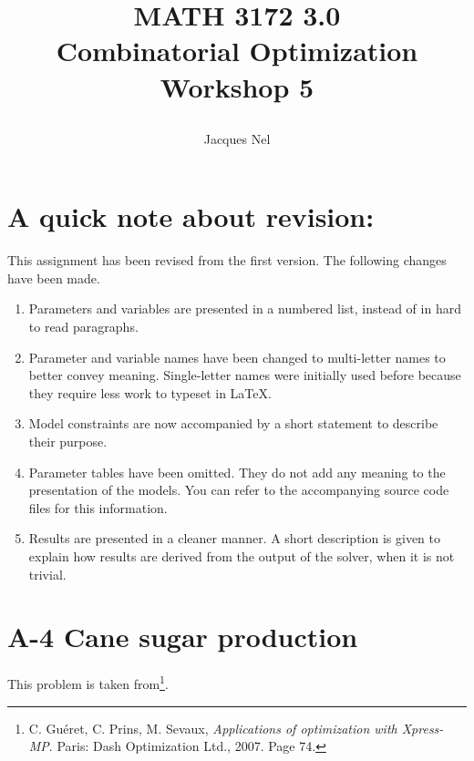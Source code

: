 \documentclass[8pt,oneside]{extarticle}
\title{{\bf MATH 3172 3.0\\ Combinatorial Optimization}\\\vspace{10pt} \large Workshop 5     
    \author{Jacques Nel}
}
\begin{document}
\maketitle

\thispagestyle{empty}

\newpage


\section*{A quick note about revision:}

This assignment has been revised from the first version. The following changes have
been made.

\begin{enumerate}

    \item Parameters and variables are presented in a numbered list, instead of
        in hard to read paragraphs.

    \item Parameter and variable names have been changed to multi-letter 
        names to better convey meaning. Single-letter names were initially used before
        because they require less work to typeset in \LaTeX.

    \item Model constraints are now accompanied by a short statement to describe
        their purpose.

    \item Parameter tables have been omitted. They do not add any meaning to the
        presentation of the models. You can refer to the accompanying source
        code files for this information.

    \item Results are presented in a cleaner manner. A short description is
        given to explain how results are derived from the output of the solver,
        when it is not trivial.

\end{enumerate}

\newpage


\section{A-4 Cane sugar production}

This problem is taken from\footnote{C. Guéret, C. Prins, M. Sevaux, \textit{Applications of optimization with Xpress-MP}. %
Paris: Dash Optimization Ltd., 2007. Page 74.}.
\end{document}

